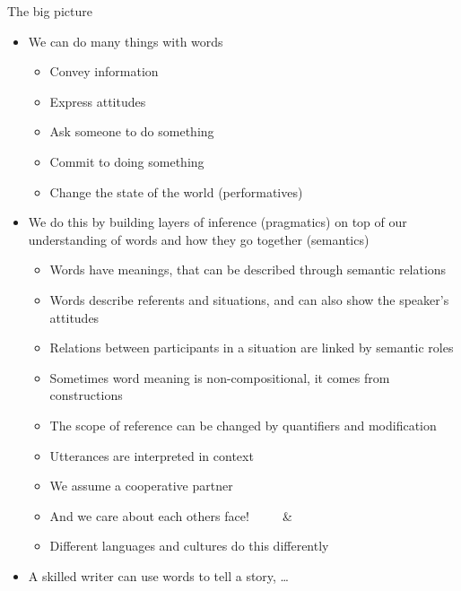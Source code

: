 \documentclass{beamer}
\newcommand{\PF}[1]{\Smiley[#1][green]}
\newcommand{\NF}[1]{\Annoey[#1][red]}
\begin{document}
\begin{frame}[allowframebreaks]{The big picture}
\begin{itemize} 
\item We can do many things with words
  \begin{itemize} \addtolength{\itemsep}{1ex}
  \item Convey information
  \item Express attitudes
  \item Ask someone to do something
  \item Commit to doing something
  \item Change the state of the world (performatives)
  \end{itemize}
\framebreak
\item We do this by building layers of inference (pragmatics) on top
  of our understanding of words and how they go together (semantics)
  \begin{itemize} \addtolength{\itemsep}{0.5ex}
  \item Words have meanings, that can be described through semantic relations
  \item Words describe referents and situations, and can also show the
    speaker's attitudes
  \item Relations between participants in a situation are linked by semantic roles
  \item Sometimes word meaning is non-compositional, it comes from constructions
  \item The scope of reference can be changed by quantifiers and modification
  \item Utterances are interpreted in context
  \item We assume a cooperative partner
  \item And we care about each others face! ~~~~ \PF{1} \& \NF{1}
  \item Different languages and cultures do this differently

  \end{itemize}
\item A skilled writer can use words to tell a story, \ldots
\end{itemize}

\end{frame}

\end{document}
